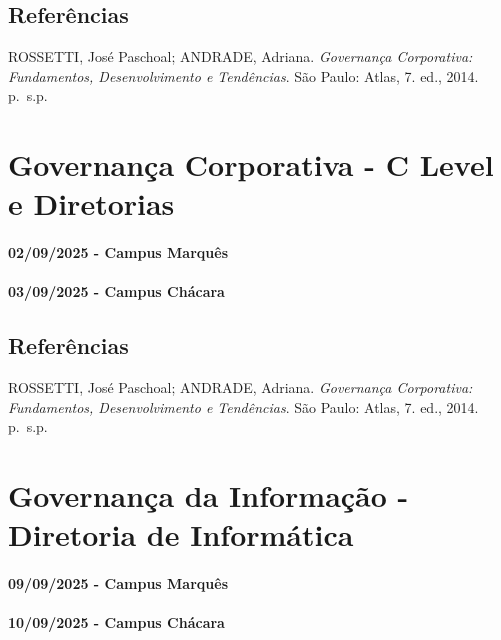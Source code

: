 \documentclass[
]{book}
\begin{document}
\section{Referências}\label{referuxeancias-2}

ROSSETTI, José Paschoal; ANDRADE, Adriana. \emph{Governança Corporativa: Fundamentos, Desenvolvimento e Tendências}. São Paulo: Atlas, 7. ed., 2014. p.~s.p.

\chapter{Governança Corporativa - C Level e Diretorias}\label{governanuxe7a-corporativa---c-level-e-diretorias}

\subsubsection*{02/09/2025 - Campus Marquês}\label{campus-marquuxeas-4}

\subsubsection*{03/09/2025 - Campus Chácara}\label{campus-chuxe1cara-4}

\section{Referências}\label{referuxeancias-3}

ROSSETTI, José Paschoal; ANDRADE, Adriana. \emph{Governança Corporativa: Fundamentos, Desenvolvimento e Tendências}. São Paulo: Atlas, 7. ed., 2014. p.~s.p.

\chapter{Governança da Informação - Diretoria de Informática}\label{governanuxe7a-da-informauxe7uxe3o---diretoria-de-informuxe1tica}

\subsubsection*{09/09/2025 - Campus Marquês}\label{campus-marquuxeas-5}

\subsubsection*{10/09/2025 - Campus Chácara}\label{campus-chuxe1cara-5}
\end{document}
